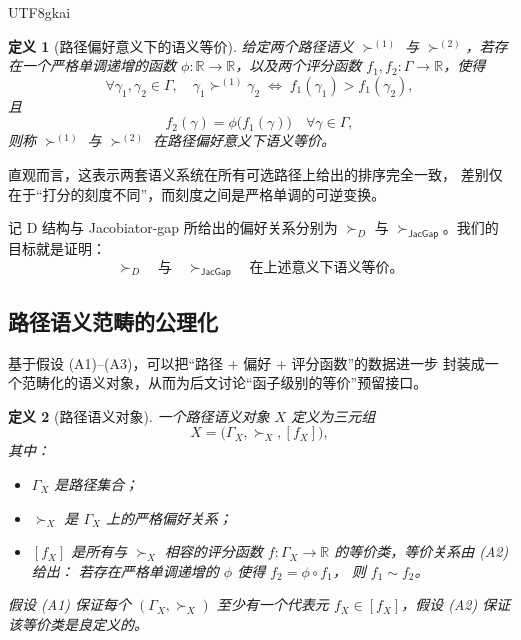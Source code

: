 \documentclass[12pt]{article}
\newtheorem{definition}{定义}[section]
\newcommand{\JacGap}{\mathsf{JacGap}}
\begin{document}
\begin{CJK*}{UTF8}{gkai}
\begin{definition}[路径偏好意义下的语义等价]
给定两个路径语义
  $\succ^{(1)}$ 与 $\succ^{(2)}$，若存在一个\emph{严格单调递增}的函数
  $\phi:\mathbb{R}\to\mathbb{R}$，以及两个评分函数
  $f_1,f_2:\Gamma\to\mathbb{R}$，使得
  \[
    \forall\gamma_1,\gamma_2\in\Gamma,\quad
    \gamma_1\succ^{(1)}\gamma_2
    \;\Longleftrightarrow\;
    f_1(\gamma_1)>f_1(\gamma_2),
  \]
  且
  \[
    f_2(\gamma)
    =\phi\bigl(f_1(\gamma)\bigr)
    \quad\forall\gamma\in\Gamma,
  \]
  则称 $\succ^{(1)}$ 与 $\succ^{(2)}$ 在\emph{路径偏好意义下语义等价}。
\end{definition}

直观而言，这表示两套语义系统在所有可选路径上给出的排序完全一致，
差别仅在于“打分的刻度不同”，而刻度之间是严格单调的可逆变换。

记 D 结构与 Jacobiator-gap 所给出的偏好关系分别为
$\succ_D$ 与 $\succ_{\JacGap}$。我们的目标就是证明：
\[
  \succ_D \quad\text{与}\quad \succ_{\JacGap}
  \quad\text{在上述意义下语义等价。}
\]

\subsection{路径语义范畴的公理化}

基于假设 (A1)–(A3)，可以把“路径 + 偏好 + 评分函数”的数据进一步
封装成一个范畴化的语义对象，从而为后文讨论“函子级别的等价”预留接口。

\begin{definition}[路径语义对象]
一个\emph{路径语义对象} $X$ 定义为三元组
  \[
    X=\bigl(\Gamma_X,\succ_X,[f_X]\bigr),
  \]
  其中：
  \begin{itemize}
    \item $\Gamma_X$ 是路径集合；
    \item $\succ_X$ 是 $\Gamma_X$ 上的严格偏好关系；
    \item $[f_X]$ 是所有与 $\succ_X$ 相容的评分函数
          $f:\Gamma_X\to\mathbb{R}$ 的等价类，等价关系由 (A2) 给出：
          若存在严格单调递增的 $\phi$ 使得 $f_2=\phi\circ f_1$，
          则 $f_1\sim f_2$。
  \end{itemize}
  假设 (A1) 保证每个 $(\Gamma_X,\succ_X)$ 至少有一个代表元
  $f_X\in[f_X]$，假设 (A2) 保证该等价类是良定义的。
\end{definition}


\end{CJK*}
\end{document}
